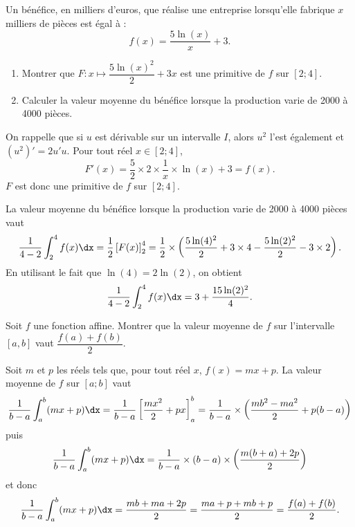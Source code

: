 \documentclass[11pt,fleqn, openany]{book} %
\begin{document}
\begin{exercise}Un bénéfice, en milliers d'euros, que réalise une entreprise lorsqu'elle fabrique $x$ milliers de pièces est égal à :
\[f(x)=\dfrac{5 \ln(x)}{x} +3.\]

\begin{enumerate}
\item Montrer que $F: x \mapsto \dfrac{5 \ln(x)^2}{2}+3x$ est une primitive de $f$ sur $[2;4]$.
\item Calculer la valeur moyenne du bénéfice lorsque la production varie de 2000 à 4000 pièces.
\end{enumerate}

\end{exercise}

\begin{solution}

 On rappelle que si \(u\) est dérivable sur un intervalle \(I\), alors \(u^2\) l'est également et \((u^2)'=2u'u\). Pour tout réel \(x\in[2;4]\), 
	\[F'(x)=\dfrac{5}{2} \times 2 \times \dfrac{1}{x} \times \ln (x) + 3 = f(x).\]
\(F\) est donc une primitive de \(f\) sur \([2;4]\).

La valeur moyenne du bénéfice lorsque la production varie de 2000 à 4000 pièces vaut
\[\dfrac{1}{4-2}\int_{2}^{4} f(x)\dx = \dfrac{1}{2}\left[F(x)\right]_{2}^4 = \dfrac{1}{2} \times \left(\dfrac{5 \ln(4)^2}{2}+3 \times 4 - \dfrac{5 \ln(2)^2}{2}-3\times 2\right).\]
	En utilisant le fait que \(\ln(4) = 2 \ln(2)\), on obtient
\[ \dfrac{1}{4-2}\int_{2}^{4} f(x)\dx = 3 + \dfrac{15\ln(2)^2}{4}.\]
\newpage
\end{solution}




\begin{exercise}Soit $f$ une fonction affine. Montrer que la valeur moyenne de $f$ sur l'intervalle $[a,b]$ vaut $\dfrac{f(a)+f(b)}{2}$.\end{exercise}

\begin{solution}

Soit \(m\) et \(p\) les réels tels que, pour tout réel \(x\), \(f(x)=mx+p\). La valeur moyenne de \(f\) sur \([a;b]\) vaut
\[\dfrac{1}{b-a} \int_a^b (mx+p)\dx = \dfrac{1}{b-a} \left[\dfrac{mx^2}{2}+px\right]_a^b = \dfrac{1}{b-a} \times \left(\dfrac{mb^2-ma^2}{2}+p(b-a)\right)\]
puis
\[\dfrac{1}{b-a} \int_a^b (mx+p)\dx = \dfrac{1}{b-a} \times (b-a) \times \left(\dfrac{m(b+a)+2p}{2}\right)\]
et donc
\[\dfrac{1}{b-a} \int_a^b (mx+p)\dx =  \dfrac{mb+ma+2p}{2} = \dfrac{ma+p+mb+p}{2}=\dfrac{f(a)+f(b)}{2}.\]
\end{solution}
\end{document}
